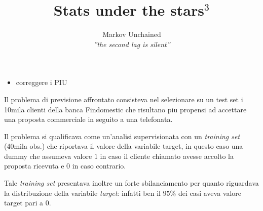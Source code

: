 \documentclass[]{scrreprt}
\title{Stats under the stars$^3$}
\author{Markov Unchained \\ \small \textit{''the second lag is silent''}}
\begin{document}
\maketitle

\begin{itemize}
	\item correggere i PIU
\end{itemize}

Il problema di previsione affrontato consisteva nel selezionare su un test set i 10mila clienti della banca Findomestic che risultano piu propensi ad accettare una proposta commerciale in seguito a una telefonata. 

Il problema si qualificava come un'analisi supervisionata con un \textit{training set} (40mila obs.) che riportava il valore della variabile target, in questo caso una dummy che assumeva valore $1$ in caso il cliente chiamato avesse accolto la proposta ricevuta e $0$ in caso contrario. 

Tale \textit{training set} presentava inoltre un forte sbilanciamento per quanto riguardava la distribuzione della variabile \textit{target}: infatti ben il $95\%$ dei casi aveva valore target pari a $0$.
\end{document}
